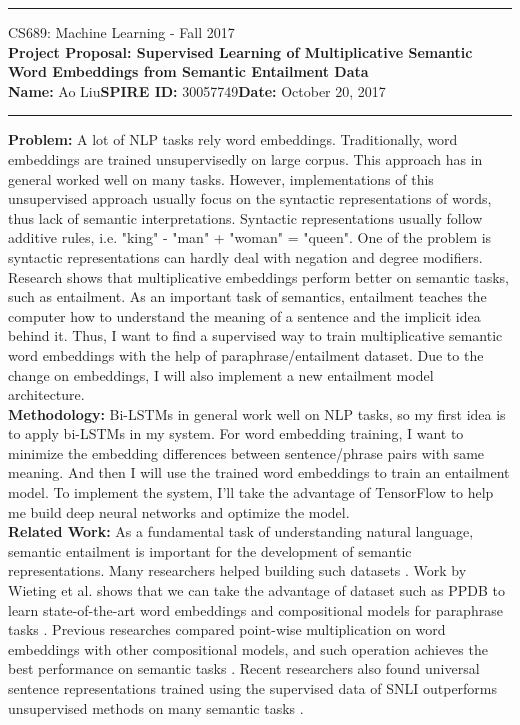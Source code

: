 \documentclass[11pt]{article}
\begin{document}
{\centering
  \rule{6.3in}{2pt}
  \vspace{0.1em}
  {\Large
    CS689: Machine Learning - Fall 2017 \\
    \textbf{Project Proposal: Supervised Learning of Multiplicative Semantic Word Embeddings from Semantic Entailment Data}\\
  }
  \vspace{0.1em}
  \textbf{Name:} Ao Liu\hspace{20pt}\textbf{SPIRE ID:} 30057749\hspace{20pt}\textbf{Date:} October 20, 2017\\
  \vspace{0.1em}
  \rule{6.3in}{1.5pt}
}
\vspace{0.1pc}

\textbf{Problem: }A lot of NLP tasks rely word embeddings. Traditionally, word embeddings are trained unsupervisedly on large corpus. This approach has in general worked well on many tasks. However, implementations of this unsupervised approach usually focus on the syntactic representations of words, thus lack of semantic interpretations. Syntactic representations usually follow additive rules, i.e. "king" - "man" + "woman" = "queen". One of the problem is syntactic representations can hardly deal with negation and degree modifiers. Research shows that multiplicative embeddings perform better on semantic tasks, such as entailment. As an important task of semantics, entailment teaches the computer how to understand the meaning of a sentence and the implicit idea behind it. Thus, I want to find a supervised way to train multiplicative semantic word embeddings with the help of paraphrase/entailment dataset. Due to the change on embeddings, I will also implement a new entailment model architecture.\\

\textbf{Methodology: }Bi-LSTMs in general work well on NLP tasks, so my first idea is to apply bi-LSTMs in my system. For word embedding training, I want to minimize the embedding differences between sentence/phrase pairs with same meaning. And then I will use the trained word embeddings to train an entailment model. To implement the system, I'll take the advantage of TensorFlow to help me build deep neural networks and optimize the model.\\

\textbf{Related Work: }As a fundamental task of understanding natural language, semantic entailment is important for the development of semantic representations. Many researchers helped building such datasets \cite{ganitkevitch2013ppdb, bowman2015large}. Work by Wieting et al. shows that we can take the advantage of dataset such as PPDB to learn state-of-the-art word embeddings and compositional models for paraphrase tasks \cite{wieting2015paraphrase}. Previous researches compared point-wise multiplication on word embeddings with other compositional models, and such operation achieves the best performance on semantic tasks \cite{mitchell2008vector, blacoe2012comparison}. Recent researchers also found universal sentence representations trained using the supervised data of SNLI outperforms unsupervised methods on many semantic tasks \cite{conneau2017supervised}.\\
\end{document}
